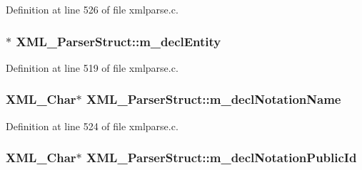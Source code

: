 Definition at line 526 of file xmlparse.\+c.

\subsubsection[{\texorpdfstring{m\+\_\+decl\+Entity}{m_declEntity}}]{$\ast$ X\+M\+L\+\_\+\+Parser\+Struct\+::m\+\_\+decl\+Entity}\hypertarget{struct_x_m_l___parser_struct_a23fe259cad6a2ef42b731ab055e6cc8c}{}\label{struct_x_m_l___parser_struct_a23fe259cad6a2ef42b731ab055e6cc8c}


Definition at line 519 of file xmlparse.\+c.

\subsubsection[{\texorpdfstring{m\+\_\+decl\+Notation\+Name}{m_declNotationName}}]{ {\bf X\+M\+L\+\_\+\+Char}$\ast$ X\+M\+L\+\_\+\+Parser\+Struct\+::m\+\_\+decl\+Notation\+Name}\hypertarget{struct_x_m_l___parser_struct_a84227a7b31ecb0850c1b80ce4802a093}{}\label{struct_x_m_l___parser_struct_a84227a7b31ecb0850c1b80ce4802a093}


Definition at line 524 of file xmlparse.\+c.

\subsubsection[{\texorpdfstring{m\+\_\+decl\+Notation\+Public\+Id}{m_declNotationPublicId}}]{ {\bf X\+M\+L\+\_\+\+Char}$\ast$ X\+M\+L\+\_\+\+Parser\+Struct\+::m\+\_\+decl\+Notation\+Public\+Id}\hypertarget{struct_x_m_l___parser_struct_aca8fc7022f16867d67973be21720b1c8}{}\label{struct_x_m_l___parser_struct_aca8fc7022f16867d67973be21720b1c8}


